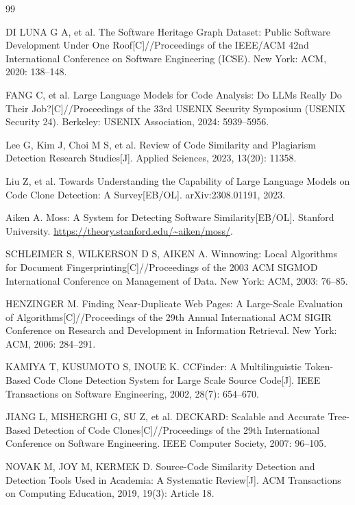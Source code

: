 \documentclass[UTF8,a4paper,zihao=5]{ctexart}
\begin{document}
\begingroup
\footnotesize
{}
\begin{thebibliography}{99}

 DI LUNA G A, et al. The Software Heritage Graph Dataset: Public Software Development Under One Roof[C]//Proceedings of the IEEE/ACM 42nd International Conference on Software Engineering (ICSE). New York: ACM, 2020: 138--148.

 FANG C, et al. Large Language Models for Code Analysis: Do LLMs Really Do Their Job?[C]//Proceedings of the 33rd USENIX Security Symposium (USENIX Security 24). Berkeley: USENIX Association, 2024: 5939--5956.

 Lee G, Kim J, Choi M S, et al. Review of Code Similarity and Plagiarism Detection Research Studies[J]. Applied Sciences, 2023, 13(20): 11358.

 Liu Z, et al. Towards Understanding the Capability of Large Language Models on Code Clone Detection: A Survey[EB/OL]. arXiv:2308.01191, 2023.

 Aiken A. Moss: A System for Detecting Software Similarity[EB/OL]. Stanford University. \url{https://theory.stanford.edu/~aiken/moss/}.

 SCHLEIMER S, WILKERSON D S, AIKEN A. Winnowing: Local Algorithms for Document Fingerprinting[C]//Proceedings of the 2003 ACM SIGMOD International Conference on Management of Data. New York: ACM, 2003: 76--85.

 HENZINGER M. Finding Near-Duplicate Web Pages: A Large-Scale Evaluation of Algorithms[C]//Proceedings of the 29th Annual International ACM SIGIR Conference on Research and Development in Information Retrieval. New York: ACM, 2006: 284--291.

 KAMIYA T, KUSUMOTO S, INOUE K. CCFinder: A Multilinguistic Token-Based Code Clone Detection System for Large Scale Source Code[J]. IEEE Transactions on Software Engineering, 2002, 28(7): 654--670.

 JIANG L, MISHERGHI G, SU Z, et al. DECKARD: Scalable and Accurate Tree-Based Detection of Code Clones[C]//Proceedings of the 29th International Conference on Software Engineering. IEEE Computer Society, 2007: 96--105.

 NOVAK M, JOY M, KERMEK D. Source-Code Similarity Detection and Detection Tools Used in Academia: A Systematic Review[J]. ACM Transactions on Computing Education, 2019, 19(3): Article 18.


\end{thebibliography}
\end{document}
